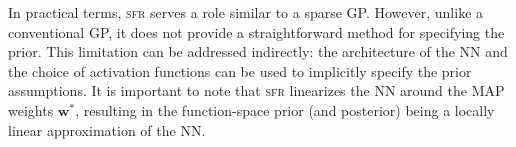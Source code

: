 \documentclass{article}
\newcommand{\our}{\textsc{sfr}\xspace}
\newcommand{\weights}{\ensuremath{\mathbf{w}}}
\begin{document}
In practical terms, \our serves a role similar to a sparse GP. However, unlike a conventional GP, it does not provide a straightforward method for specifying the prior.%
This limitation can be addressed indirectly: the architecture of the NN and the choice of activation functions can be used to implicitly specify the prior assumptions.
It is important to note that \our linearizes the NN around the MAP weights $\weights^{*}$, resulting in the function-space prior
(and posterior) being a locally linear approximation of the NN.



\clearpage






\newpage
\appendix
\onecolumn
\end{document}

